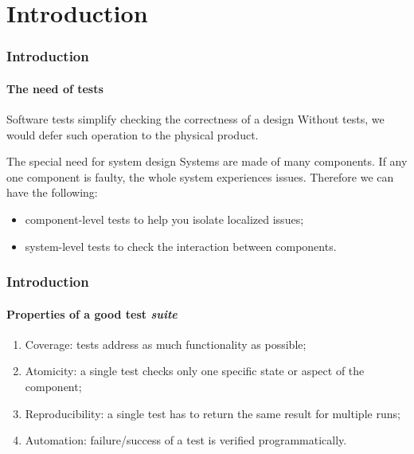 \section{Introduction}

\begin{frame}
\frametitle{Introduction}
\framesubtitle{The need of tests}

\begin{block}{Software tests simplify checking the correctness of a design}
Without tests, we would defer such operation to the physical product.
\end{block}
\pause
\begin{block}{The special need for system design}
Systems are made of many components. If any one component is faulty, the whole system experiences issues. 
Therefore we can have the following:
\begin{itemize}
\item component-level tests to help you isolate localized issues;
\item system-level tests to check the interaction between components.
\end{itemize}
\end{block}
\end{frame}

\begin{frame}
\frametitle{Introduction}
\framesubtitle{Properties of a good test {\em suite}}

\begin{enumerate}
\item Coverage: tests address as much functionality as possible;
\pause
\item Atomicity: a single test checks only one specific state or aspect of the component;
\pause
\item Reproducibility: a single test has to return the same result for multiple runs;
\pause
\item Automation: failure/success of a test is verified programmatically.
\end{enumerate}

\end{frame}

